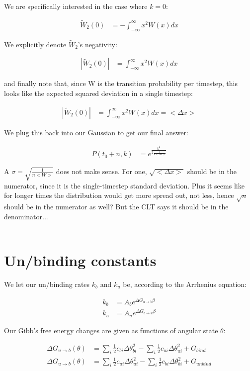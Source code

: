 \documentclass[10pt]{article} %
\begin{document}
We are specifically interested in the case where $k=0$:

\begin{align*}
  \widetilde{W}_2(0) &= -\int_{-\infty}^\infty x^2W(x)dx
\end{align*}

We explicitly denote $\widetilde{W}_2$'s negativity:

\begin{align*}
  |\widetilde{W}_2(0)| &= \int_{-\infty}^\infty x^2W(x)dx
\end{align*}

and finally note that, since W is the transition probability per timestep, this looks like the expected squared deviation in a single timestep:

\begin{align*}
  |\widetilde{W}_2(0)| &= \int_{-\infty}^\infty x^2W(x)dx = <\Delta x>
\end{align*}

We plug this back into our Gaussian to get our final answer:

\begin{align}
  P(t_0+n,k) &= e^{\frac{k^2}{2\frac{1}{n<\Delta x>}}}
\end{align}

A $\sigma = \sqrt{\frac{1}{n<W>}}$ does not make sense. For one, $\sqrt{<\Delta x>}$ should be in the numerator, since it is the
single-timestep standard deviation. Plus it seems like for longer times the distribution would get more spread out, not less, hence
$\sqrt{n}$ should be in the numerator as well? But the CLT says it should be in the denominator...\\
\\

\section{Un/binding constants}
We let our un/binding rates $k_b$ and $k_u$ be, according to the Arrhenius equation:

\begin{align}
  k_b &= A_be^{\Delta G_{u\rightarrow b}\beta}\\
  k_u &= A_ue^{\Delta G_{b\rightarrow u}\beta}
\end{align}

Our Gibb's free energy changes are given as functions of angular state $\theta$:

\begin{align}
  \Delta G_{u\rightarrow b}(\theta) &= \sum_i \frac{1}{2}c_{bi}\Delta\theta_{bi}^2 - \sum_i \frac{1}{2}c_{ui}\Delta\theta_{ui}^2 + G_{bind}\\
  \Delta G_{u\rightarrow b}(\theta) &= \sum_i \frac{1}{2}c_{ui}\Delta\theta_{ui}^2 - \sum_i \frac{1}{2}c_{bi}\Delta\theta_{bi}^2 + G_{unbind}\\
\end{align}
\end{document}
